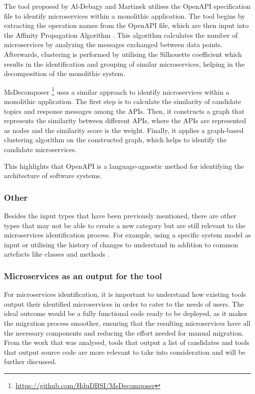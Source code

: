 \documentclass[conference]{IEEEtran}
\begin{document}
The tool proposed by Al-Debagy and Martinek  utilises the
OpenAPI specification file to identify microservices within a monolithic
application. The tool begins by extracting the operation names from the OpenAPI
file, which are then input into the Affinity Propagation Algorithm
\cite{frey2007clustering}. This algorithm calculates the number of
microservices by analyzing the messages exchanged between data points.
Afterwards, clustering is performed by utilising the Silhouette coefficient
\cite{rousseeuw1987silhouettes} which results in the identification and
grouping of similar microservices, helping in the decomposition of the
monolithic system.

MsDecomposer \footnote{\url{https://github.com/HduDBSI/MsDecomposer}}
 uses a similar approach to identify microservices
within a monolithic application. The first step is to calculate the similarity
of candidate topics and response messages among the APIs. Then, it constructs a
graph that represents the similarity between different APIs, where the APIs are
represented as nodes and the similarity score is the weight. Finally, it
applies a graph-based clustering algorithm on the constructed graph, which
helps to identify the candidate microservices.

This highlights that OpenAPI is a language-agnostic method for identifying the
architecture of software systems.

\subsubsection*{Other}

Besides the input types that have been previously mentioned, there are other
types that may not be able to create a new category but are still relevant to
the microservices identification process. For example, using a specific system
model as input  or utilising the history of changes
to understand in addition to common artefacts like classes and methods
.

\subsubsection{Microservices as an output for the tool}

For microservices identification, it is important to understand how existing
tools output their identified microservices in order to cater to the needs of
users. The ideal outcome would be a fully functional code ready to be deployed,
as it makes the migration process smoother, ensuring that the resulting
microservices have all the necessary components and reducing the effort needed
for manual migration. From the work that was analysed, tools that output a list
of candidates and tools that output source code are more relevant to take into
consideration and will be further discussed.
\end{document}
